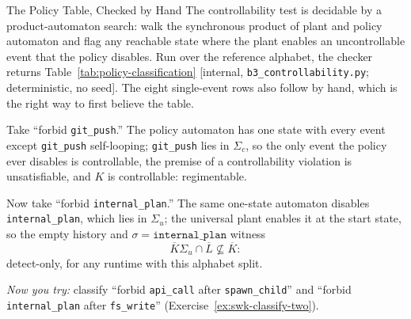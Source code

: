 \documentclass[11pt,a4paper]{article}
\theoremstyle{definition}
\theoremstyle{remark}
\begin{document}
\begin{pdexample}{The Policy Table, Checked by Hand}
\setlength{\parskip}{4pt plus 1pt}
The controllability test is decidable by a product-automaton search: walk the synchronous
product of plant and policy automaton and flag any reachable state where the plant enables an
uncontrollable event that the policy disables. Run over the reference alphabet, the checker
returns Table~\ref{tab:policy-classification} [internal, \texttt{b3\_controllability.py};
deterministic, no seed]. The eight single-event rows also follow by hand, which is the right
way to first believe the table.

Take ``forbid \texttt{git\_push}.'' The policy automaton has
one state with every event except \texttt{git\_push} self-looping; \texttt{git\_push} lies in
$\Sigma_c$, so the only event the policy ever disables is controllable, the premise of a
controllability violation is unsatisfiable, and $K$ is controllable: regimentable.

Now take
``forbid \texttt{internal\_plan}.'' The same one-state automaton disables
\texttt{internal\_plan}, which lies in $\Sigma_u$; the universal plant enables it at the start
state, so the empty history and $\sigma = \texttt{internal\_plan}$ witness
\[
\overline{K}\Sigma_u \cap \overline{L} \not\subseteq \overline{K}:
\]
detect-only, for any
runtime with this alphabet split.

\emph{Now you try:} classify ``forbid \texttt{api\_call}
after \texttt{spawn\_child}'' and ``forbid \texttt{internal\_plan} after \texttt{fs\_write}''
(Exercise~\ref{ex:swk-classify-two}).
\end{pdexample}
\end{document}
